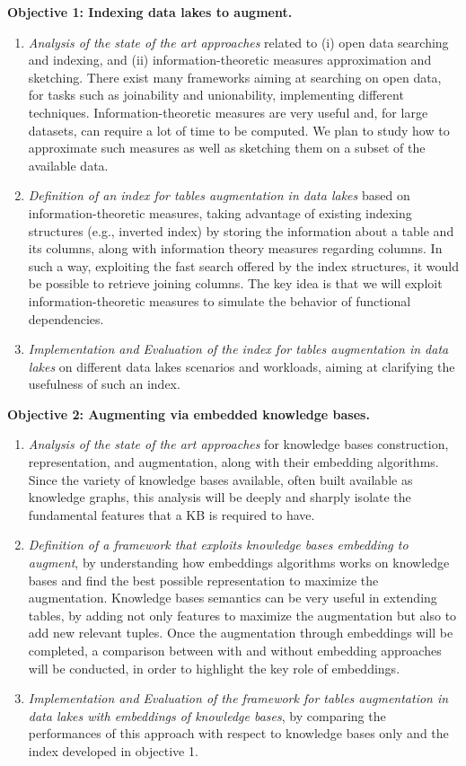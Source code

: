 \bigbreak

\noindent\textbf{Objective 1: Indexing data lakes to augment.}
\begin{enumerate}
    \item \textit{Analysis of the state of the art approaches} related to (i) open data searching and indexing, and (ii) information-theoretic measures approximation and sketching. There exist many frameworks aiming at searching on open data, for tasks such as joinability and unionability, implementing different techniques. Information-theoretic measures are very useful and, for large datasets, can require a lot of time to be computed. We plan to study how to approximate such measures as well as sketching them on a subset of the available data.
    \item \textit{Definition of an index for tables augmentation in data lakes} based on information-theoretic measures, taking advantage of existing indexing structures (e.g., inverted index) by storing the information about a table and its columns, along with information theory measures regarding columns. In such a way, exploiting the fast search offered by the index structures, it would be possible to retrieve joining columns. The key idea is that we will exploit information-theoretic measures to simulate the behavior of functional dependencies. 
    \item \textit{Implementation and Evaluation of the index for tables augmentation in data lakes} on different data lakes scenarios and workloads, aiming at clarifying the usefulness of such an index.
\end{enumerate}


\noindent\textbf{Objective 2: Augmenting via embedded knowledge bases.}
\begin{enumerate}
    \item \textit{Analysis of the state of the art approaches} for knowledge bases construction, representation, and augmentation, along with their embedding algorithms. Since the variety of knowledge bases available, often built available as knowledge graphs, this analysis will be deeply and sharply isolate the fundamental features that a KB is required to have.
    \item \textit{Definition of a framework that exploits knowledge bases embedding to augment}, by understanding how embeddings algorithms works on knowledge bases and find the best possible representation to maximize the augmentation. Knowledge bases semantics can be very useful in extending tables, by adding not only features to maximize the augmentation but also to add new relevant tuples. Once the augmentation through embeddings will be completed, a comparison between with and without embedding approaches will be conducted, in order to highlight the key role of embeddings.
    \item \textit{Implementation and Evaluation of the framework for tables augmentation in data lakes with embeddings of knowledge bases}, by comparing the performances of this approach with respect to knowledge bases only and the index developed in objective 1.
\end{enumerate}

